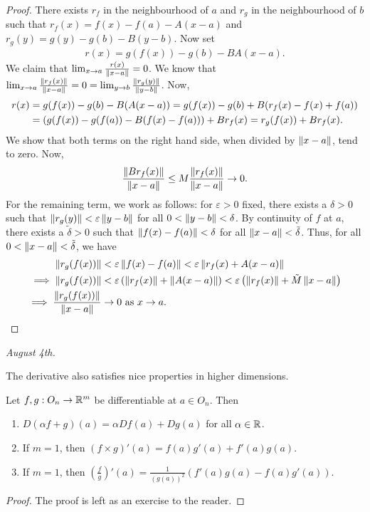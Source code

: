 \begin{proof}
    There exists $r_{f}$ in the neighbourhood of $a$ and $r_{g}$ in the neighbourhood of $b$ such that $r_{f}(x) = f(x)-f(a)-A(x-a)$ and $r_{g}(y) = g(y)-g(b)-B(y-b)$. Now set
    \begin{align}
        r(x) = g(f(x)) - g(b) - BA(x-a).
    \end{align}
    We claim that $\lim_{x \to a} \frac{r(x)}{\left\lVert x-a\right\rVert} = 0$. We know that $\lim_{x \to a} \frac{\left\lVert r_{f}(x)\right\rVert}{\left\lVert x-a\right\rVert} = 0 = \lim_{y \to b} \frac{\left\lVert r_{g}(y)\right\rVert}{\left\lVert y-b\right\rVert}$. Now,
    \begin{align}
        r(x) &= g(f(x))-g(b)-B(A(x-a)) = g(f(x)) - g(b) + B(r_{f}(x)-f(x)+f(a)) \notag\\
        &= \left( g(f(x)) - g(f(a)) - B(f(x)-f(a)) \right) + Br_{f}(x) \notag = r_{g}(f(x)) + Br_{f}(x).
    \end{align}
    We show that both terms on the right hand side, when divided by $\left\lVert x-a\right\rVert$, tend to zero. Now,
    \begin{align}
        \frac{\left\lVert Br_{f}(x)\right\rVert}{\left\lVert x-a\right\rVert} \leq M\frac{\left\lVert r_{f}(x)\right\rVert}{\left\lVert x-a\right\rVert} \to 0.
    \end{align}
    For the remaining term, we work as follows: for $\varepsilon > 0$ fixed, there exists a $\delta > 0$ such that $\left\lVert r_{g}(y)\right\rVert < \varepsilon\left\lVert y-b\right\rVert$ for all $0 < \left\lVert y-b\right\rVert < \delta$. By continuity of $f$ at $a$, there exists a $\tilde{\delta} > 0$ such that $\left\lVert f(x)-f(a)\right\rVert < \delta$ for all $\left\lVert x-a\right\rVert < \tilde{\delta}$. Thus, for all $0 < \left\lVert x-a\right\rVert < \tilde{\delta}$, we have
    \begin{align}
        \left\lVert r_{g}(f(x))\right\rVert &< \varepsilon \left\lVert f(x)-f(a)\right\rVert < \varepsilon \left\lVert r_{f}(x)+A(x-a)\right\rVert \\
        \implies \left\lVert r_{g}(f(x))\right\rVert &< \varepsilon \left( \left\lVert r_{f}(x)\right\rVert + \left\lVert A(x-a)\right\rVert \right) < \varepsilon \left( \left\lVert r_{f}(x)\right\rVert + \tilde{M} \left\lVert x-a\right\rVert \right) \notag \\
        \implies \frac{\left\lVert r_{g}(f(x))\right\rVert}{\left\lVert x-a\right\rVert} &\to 0 \text{ as } x \to a.
    \end{align}
\end{proof}
\noindent \textit{August 4th.}

The derivative also satisfies nice properties in higher dimensions.

\begin{proposition}
    Let $f,g: O_{n} \to \mathbb{R}^{m}$ be differentiable at $a \in O_{n}$. Then
    \begin{enumerate}
        \item $D(\alpha f + g)(a) = \alpha Df(a) + Dg(a)$ for all $\alpha \in \mathbb{R}$.
        \item If $m = 1$, then $(f \times g)'(a) = f(a)g'(a) + f'(a)g(a)$.
        \item If $m = 1$, then $\left( \frac{f}{g} \right)'(a) = \frac{1}{(g(a))^{2}} (f'(a)g(a) - f(a)g'(a))$.
    \end{enumerate}
\end{proposition}
\begin{proof}
    The proof is left as an exercise to the reader.
\end{proof}

